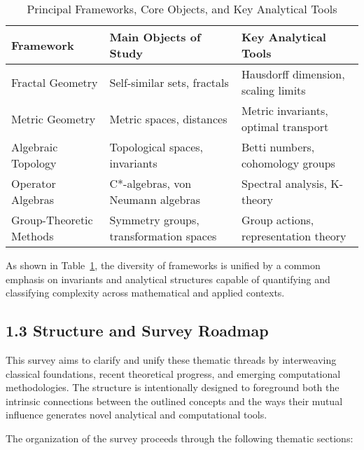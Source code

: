 \documentclass[11pt]{article}
\begin{document}
\begin{table}[h]
    \centering
    \caption{Principal Frameworks, Core Objects, and Key Analytical Tools}
    \label{tab:framework_overview}
    \begin{tabular}{|l|l|l|}
        \hline
        \textbf{Framework}         & \textbf{Main Objects of Study}         & \textbf{Key Analytical Tools}             \\
        \hline
        Fractal Geometry           & Self-similar sets, fractals            & Hausdorff dimension, scaling limits       \\
        Metric Geometry            & Metric spaces, distances                & Metric invariants, optimal transport      \\
        Algebraic Topology         & Topological spaces, invariants          & Betti numbers, cohomology groups          \\
        Operator Algebras          & C*-algebras, von Neumann algebras       & Spectral analysis, K-theory               \\
        Group-Theoretic Methods    & Symmetry groups, transformation spaces  & Group actions, representation theory      \\
        \hline
    \end{tabular}
\end{table}

As shown in Table~\ref{tab:framework_overview}, the diversity of frameworks is unified by a common emphasis on invariants and analytical structures capable of quantifying and classifying complexity across mathematical and applied contexts.

\subsection{1.3 Structure and Survey Roadmap}

This survey aims to clarify and unify these thematic threads by interweaving classical foundations, recent theoretical progress, and emerging computational methodologies. The structure is intentionally designed to foreground both the intrinsic connections between the outlined concepts and the ways their mutual influence generates novel analytical and computational tools.

The organization of the survey proceeds through the following thematic sections:
\end{document}
